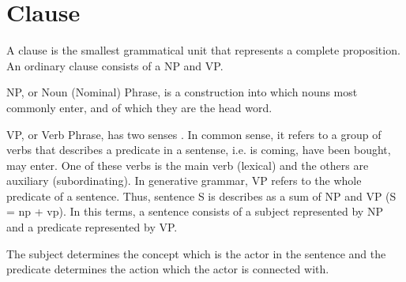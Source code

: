 \section{Clause}

A clause is the smallest grammatical unit that represents a complete proposition. An ordinary clause consists of a NP and VP.


NP, or Noun (Nominal) Phrase, is a construction into which nouns most commonly enter, and of which they are the head word. \cite{lang-dict}

VP, or Verb Phrase, has two senses \cite{lang-dict}. In common sense, it refers to a group of verbs that describes a predicate in a sentense, i.e. is coming, have been bought, may enter. One of these verbs is the main verb (lexical) and the others are auxiliary (subordinating). In generative grammar, VP refers to the whole predicate of a sentence. Thus, sentence S is describes as a sum of NP and VP (S = \gls{np} + \gls{vp}). In this terms, a sentence consists of a subject represented by NP and a predicate represented by VP.

The subject determines the concept which is the actor in the sentence and the predicate determines the action which the actor is connected with.



